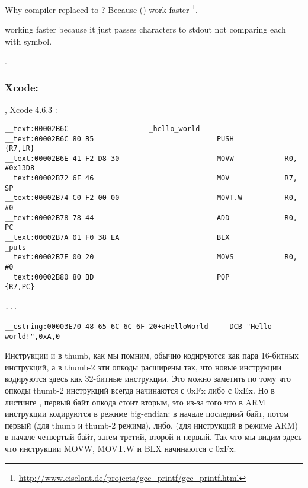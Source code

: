 {Why compiler replaced \printf to \puts? Because \puts() work faster}
\footnote{\url{http://www.ciselant.de/projects/gcc_printf/gcc_printf.html}}. 

{\puts working faster because it just passes characters to stdout not comparing each with \IT{\%} symbol.}

 .

\subsubsection{ Xcode: }

, Xcode 4.6.3 :

\begin{lstlisting}
__text:00002B6C                   _hello_world
__text:00002B6C 80 B5                             PUSH            {R7,LR}
__text:00002B6E 41 F2 D8 30                       MOVW            R0, #0x13D8
__text:00002B72 6F 46                             MOV             R7, SP
__text:00002B74 C0 F2 00 00                       MOVT.W          R0, #0
__text:00002B78 78 44                             ADD             R0, PC
__text:00002B7A 01 F0 38 EA                       BLX             _puts
__text:00002B7E 00 20                             MOVS            R0, #0
__text:00002B80 80 BD                             POP             {R7,PC}

...

__cstring:00003E70 48 65 6C 6C 6F 20+aHelloWorld     DCB "Hello world!",0xA,0
\end{lstlisting}

Инструкции  и  в thumb, как мы помним, обычно кодируются как пара 16-битных инструкций, 
а в thumb-2 эти  опкоды расширены так, что новые инструкции кодируются здесь как 
32-битные инструкции. 
Это можно заметить по тому что опкоды thumb-2 инструкций всегда начинаются с 0xFx либо с 0xEx. 
Но в листинге \IDA, первый байт опкода стоит вторым, это из-за того что в ARM инструкции кодируются в режиме big-endian: в начале последний байт, потом первый (для thumb и thumb-2 режима), либо, (для инструкций в режиме ARM) в начале четвертый байт, затем третий, второй и первый. 
Так что мы видим здесь что инструкции MOVW, MOVT.W и BLX начинаются с 0xFx.

